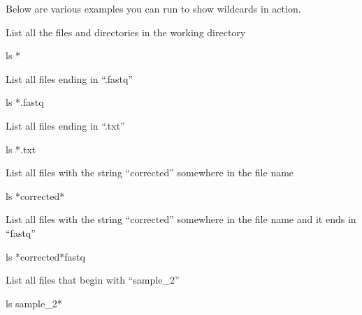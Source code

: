 \documentclass[
  letterpaper,
  DIV=11,
  numbers=noendperiod]{scrreprt}
\newenvironment{Shaded}{\begin{snugshade}}{\end{snugshade}}
\newcommand{\FunctionTok}[1]{\textcolor[rgb]{0.28,0.35,0.67}{#1}}
\newcommand{\NormalTok}[1]{\textcolor[rgb]{0.00,0.23,0.31}{#1}}
\newcommand{\PreprocessorTok}[1]{\textcolor[rgb]{0.68,0.00,0.00}{#1}}
\begin{document}
Below are various examples you can run to show wildcards in action.

List all the files and directories in the working directory

\begin{Shaded}
\begin{Highlighting}[]
\FunctionTok{ls} \PreprocessorTok{*}
\end{Highlighting}
\end{Shaded}

List all files ending in ``.fastq''

\begin{Shaded}
\begin{Highlighting}[]
\FunctionTok{ls} \PreprocessorTok{*}\NormalTok{.fastq}
\end{Highlighting}
\end{Shaded}

List all files ending in ``.txt''

\begin{Shaded}
\begin{Highlighting}[]
\FunctionTok{ls} \PreprocessorTok{*}\NormalTok{.txt}
\end{Highlighting}
\end{Shaded}

List all files with the string ``corrected'' somewhere in the file name

\begin{Shaded}
\begin{Highlighting}[]
\FunctionTok{ls} \PreprocessorTok{*}\NormalTok{corrected}\PreprocessorTok{*}
\end{Highlighting}
\end{Shaded}

List all files with the string ``corrected'' somewhere in the file name
and it ends in ``fastq''

\begin{Shaded}
\begin{Highlighting}[]
\FunctionTok{ls} \PreprocessorTok{*}\NormalTok{corrected}\PreprocessorTok{*}\NormalTok{fastq}
\end{Highlighting}
\end{Shaded}

List all files that begin with ``sample\_2''

\begin{Shaded}
\begin{Highlighting}[]
\FunctionTok{ls}\NormalTok{ sample\_2}\PreprocessorTok{*}
\end{Highlighting}
\end{Shaded}
\end{document}
